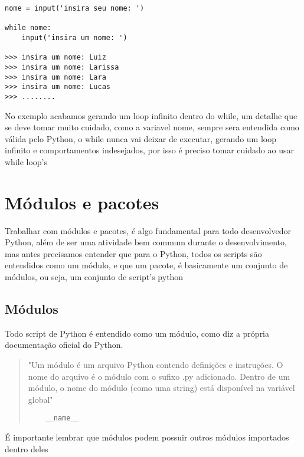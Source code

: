 \begin{lstlisting}
nome = input('insira seu nome: ')

while nome:
    input('insira um nome: ')

>>> insira um nome: Luiz
>>> insira um nome: Larissa
>>> insira um nome: Lara
>>> insira um nome: Lucas
>>> ........

\end{lstlisting}     

No exemplo acabamos gerando um loop infinito dentro do while, um detalhe que se deve tomar muito cuidado, como a variavel nome, sempre sera entendida como válida pelo Python, o while nunca vai deixar de executar, gerando um loop infinito e comportamentos indesejados, por isso é preciso tomar cuidado ao usar while loop's

    \section{M\'{o}dulos e pacotes}
    Trabalhar com módulos e pacotes, é algo fundamental para todo desenvolvedor Python, além de ser uma atividade bem commum durante o desenvolvimento, mas antes precisamos entender que para o Python, todos os scripts são entendidos como um módulo, e que um pacote, é basicamente um conjunto de módulos, ou seja, um conjunto de script's python
    


            \subsection{M\'{o}dulos}
            Todo script de Python é entendido como um módulo, como diz a própria documentação oficial do Python.
            
\begin{quote}
 "Um módulo é um arquivo Python contendo definições e instruções. O nome do arquivo é o módulo com o sufixo .py adicionado. Dentro de um módulo, o nome do módulo (como uma string) está disponível na variável global" 
 
\begin{lstlisting}
    __name__
\end{lstlisting}
\end{quote}
    
    É importante lembrar que módulos podem possuir outros módulos importados dentro deles 

